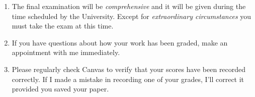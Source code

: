 \documentclass[12pt]{article}
\newcounter{ex}\setcounter{ex}{0}
\begin{document}
\begin{enumerate}
\item The final examination will be \emph{comprehensive} and it will be given 
during the  time scheduled by the University. Except for \emph{extraordinary circumstances}
you must take the exam at this time.
 
\item If you have questions about how your work has been graded, make an appointment with me immediately.


\item Please regularly check Canvas  to verify that your scores have 
been recorded correctly.  If I made a mistake in recording one of
your grades, I'll correct it provided you saved your paper.



\end{enumerate}
  
 
\end{document}
